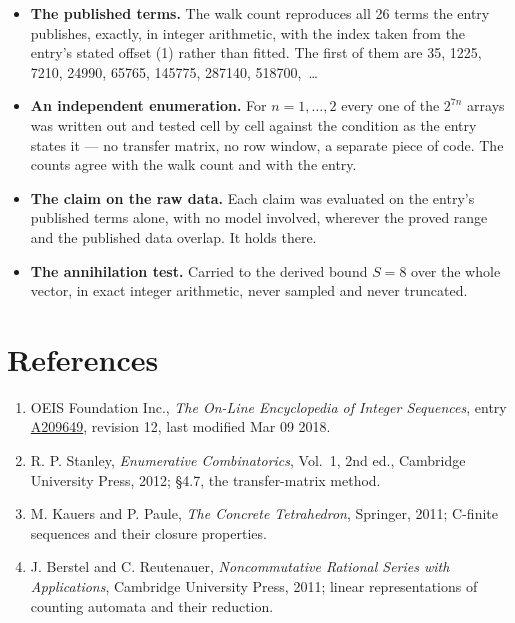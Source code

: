 \documentclass[11pt]{article}
\theoremstyle{definition}
\begin{document}
\begin{itemize}

\item {\bfseries The published terms.} The walk count reproduces all 26 terms the entry publishes, exactly, in integer arithmetic, with the index taken from the entry's stated offset (1) rather than fitted. The first of them are 35, 1225, 7210, 24990, 65765, 145775, 287140, 518700,~\dots

\item {\bfseries An independent enumeration.} For $n = 1,\dots,2$ every one of the $2^{7n}$ arrays was written out and tested cell by cell against the condition as the entry states it --- no transfer matrix, no row window, a separate piece of code. The counts agree with the walk count and with the entry.

\item {\bfseries The claim on the raw data.} Each claim was evaluated on the entry's published terms alone, with no model involved, wherever the proved range and the published data overlap. It holds there.

\item {\bfseries The annihilation test.} Carried to the derived bound $S = 8$ over the whole vector, in exact integer arithmetic, never sampled and never truncated.

\end{itemize}

\section{References}

\begin{enumerate}

\item OEIS Foundation Inc., \emph{The On-Line Encyclopedia of Integer Sequences}, entry \href{https://oeis.org/A209649}{A209649}, revision 12, last modified Mar 09 2018.

\item R. P. Stanley, \emph{Enumerative Combinatorics}, Vol.~1, 2nd ed., Cambridge University Press, 2012; \S4.7, the transfer-matrix method.

\item M. Kauers and P. Paule, \emph{The Concrete Tetrahedron}, Springer, 2011; C-finite sequences and their closure properties.

\item J. Berstel and C. Reutenauer, \emph{Noncommutative Rational Series with Applications}, Cambridge University Press, 2011; linear representations of counting automata and their reduction.

\end{enumerate}
\end{document}
